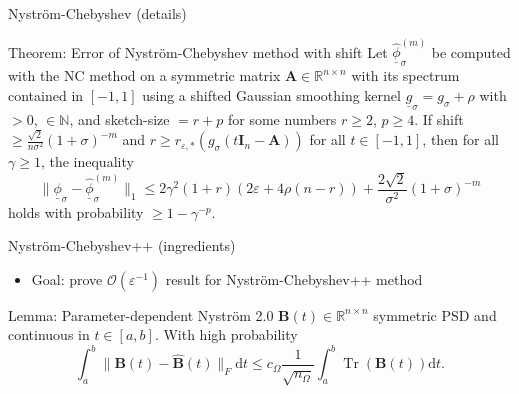 \documentclass[aspectratio=169, leqno, 12pt]{beamer}
\newcommand{\mtx}[1]{\boldsymbol{#1}}
\DeclareMathOperator{\Tr}{Tr}
\begin{document}
\begin{frame}{Nystr\"om-Chebyshev (details)}
    \begin{block}{Theorem: Error of Nystr\"om-Chebyshev method with shift}
        Let $\widehat{\underline{\phi}}_{\sigma}^{(m)}$ be computed with
        the \gls{NC} method on a symmetric matrix
        $\mtx{A} \in \mathbb{R}^{n \times n}$ with its spectrum contained in $[-1, 1]$
        using a shifted Gaussian smoothing kernel $\underline{g}_{\sigma} = g_{\sigma} + \rho$
        with  $>0$,  $\in \mathbb{N}$, and
        \gls{sketch-size} $=r + p$ for some numbers $r \geq 2$, $p \geq 4$.
        If \gls{shift} $\geq \frac{\sqrt{2}}{n \sigma^2}  (1 + \sigma)^{-m}$
        and $r \geq r_{\varepsilon, \ast}(g_{\sigma}(t\mtx{I}_n - \mtx{A}))$ for all
        $t \in [-1, 1]$, then for all $\gamma \geq 1$, the inequality
        \begin{equation}
            \lVert \underline{\phi}_{\sigma} - \widehat{\underline{\phi}}_{\sigma}^{(m)} \rVert _1
            \leq 2 \gamma^2(1 + r) (2 \varepsilon + 4 \rho (n-r))
            + \frac{2\sqrt{2}}{\sigma^2} (1 + \sigma)^{-m}
        \end{equation}
        holds with probability $\geq 1-\gamma^{-p}$.
    \end{block}
\end{frame}

\begin{frame}{Nystr\"om-Chebyshev++ (ingredients)}
    \begin{itemize}
        \item Goal: prove $\mathcal{O}(\varepsilon^{-1})$ result for Nystr\"om-Chebyshev++ method
    \end{itemize}
    \begin{block}{Lemma: Parameter-dependent Nystr\"om 2.0 \cite{he2023parameter}}
        $\mtx{B}(t) \in \mathbb{R}^{n \times n}$ symmetric \gls{PSD} and
        continuous in $t \in [a, b]$. With high probability
        \begin{equation}
            \int_{a}^{b} \lVert \mtx{B}(t) - \widehat{\mtx{B}}(t) \rVert _F \mathrm{d}t \leq c_{\Omega} \frac{1}{\sqrt{n_{\Omega}}} \int_{a}^{b} \Tr(\mtx{B}(t)) \mathrm{d}t.
        \end{equation}
    \end{block}
\end{frame}
\end{document}
